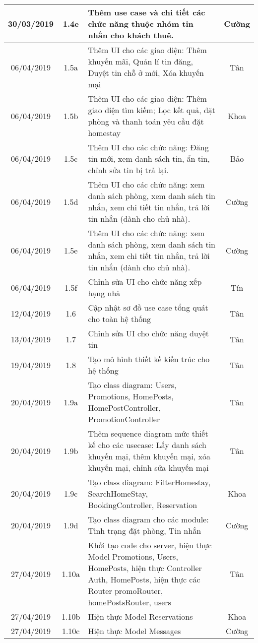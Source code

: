 \begin{center}
\begin{longtable}{ | c | c | p{5cm} |c|}
		30/03/2019 & 1.4e & Thêm use case và chi tiết các chức năng thuộc nhóm tin nhắn cho khách thuê. & Cường \\ \hline
		
		06/04/2019 & 1.5a & Thêm UI cho các giao diện: Thêm khuyến mãi, Quản lí tin đăng, Duyệt tin chỗ ở mới, Xóa khuyến mại & Tân \\ \hline 
		06/04/2019 & 1.5b & Thêm UI cho các giao diện: Thêm giao diện tìm kiếm; Lọc kết quả, đặt phòng và thanh toán yêu cầu đặt homestay & Khoa \\ \hline
		06/04/2019 & 1.5c & Thêm UI cho các chức năng: Đăng tin mới, xem danh sách tin, ẩn tin, chỉnh sửa tin bị trả lại. & Bảo \\ \hline
		06/04/2019 & 1.5d & Thêm UI cho các chức năng: xem danh sách phòng, xem danh sách tin nhắn, xem chi tiết tin nhắn, trả lời tin nhắn (dành cho chủ nhà). & Cường \\ \hline
		06/04/2019 & 1.5e & Thêm UI cho các chức năng: xem danh sách phòng, xem danh sách tin nhắn, xem chi tiết tin nhắn, trả lời tin nhắn (dành cho chủ nhà). & Cường \\ \hline
		06/04/2019 & 1.5f & Chỉnh sửa UI cho chức năng xếp hạng nhà & Tín \\ \hline
		12/04/2019 & 1.6 & Cập nhật sơ đồ use case tổng quát cho toàn hệ thống & Tân \\ \hline
		13/04/2019 & 1.7 & Chỉnh sửa UI cho chức năng duyệt tin & Tân \\ \hline
		19/04/2019 & 1.8 & Tạo mô hình thiết kế kiến trúc cho hệ thống & Tân \\ \hline
		20/04/2019 & 1.9a & Tạo class diagram: Users, Promotions, HomePosts, HomePostController, PromotionController & Tân \\ \hline
		20/04/2019 & 1.9b & Thêm sequence diagram mức thiết kế cho các usecase: Lấy danh sách khuyến mại, thêm khuyến mại, xóa khuyến mại, chỉnh sửa khuyến mại & Tân \\ \hline
		20/04/2019 & 1.9c & Tạo class diagram: FilterHomestay, SearchHomeStay, BookingController, Reservation & Khoa \\ \hline
		20/04/2019 & 1.9d & Tạo class diagram cho các module: Tình trạng đặt phòng, Tin nhắn & Cường \\ \hline
		27/04/2019 & 1.10a & Khởi tạo code cho server, hiện thực Model Promotions, Users, HomePosts, hiện thực Controller Auth, HomePosts, hiện thực các Router promoRouter, homePostsRouter, users  & Tân \\ \hline
		27/04/2019 & 1.10b & Hiện thực Model Reservations  & Khoa \\ \hline
		27/04/2019 & 1.10c & Hiện thực Model Messages  & Cường \\ \hline
		\end{longtable}
\end{center}